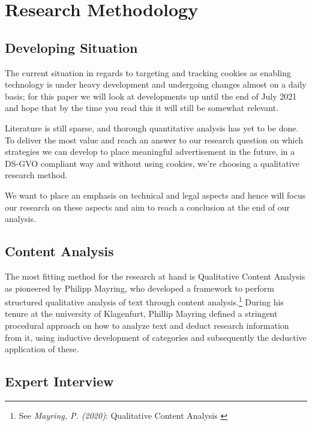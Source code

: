 %
%

\pagebreak
\section{Research Methodology}

\onehalfspacing

\subsection{Developing Situation}

The current situation in regards to targeting and tracking cookies as enabling technology is under heavy development and undergoing changes almost on a daily basis; for this paper we will look at developments up until the end of July 2021 and hope that by the time you read this it will still be somewhat relevant.

Literature is still sparse, and thorough quantitative analysis has yet to be done. To deliver the most value and reach an answer to our research question on which strategies we can develop to place meaningful advertisement in the future, in a DS-GVO compliant way and without using cookies, we're choosing a qualitative research method.

We want to place an emphasis on technical and legal aspects and hence will focus our research on these aspects and aim to reach a conclusion at the end of our analysis.

\subsection{Content Analysis}

The most fitting method for the research at hand is Qualitative Content Analysis as pioneered by Philipp Mayring, who developed a framework to perform structured qualitative analysis of text through content analysis.\footnote{See \textit{Mayring, P. (2020)}: Qualitative Content Analysis \cite{qualiContent}} During his tenure at the university of Klagenfurt, Phillip Mayring defined a stringent procedural approach on how to analyze text and deduct research information from it, using inductive development of categories and subsequently the deductive application of these.

\subsection{Expert Interview}

